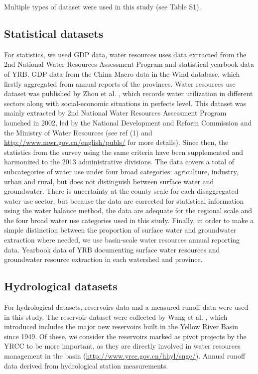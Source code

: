 \documentclass[9pt,twoside,lineno]{pnas-new}
\begin{document}
Multiple types of dataset were used in this study (see Table S1). 
\subsection*{Statistical datasets}
For statistics, we used GDP data, water resources uses data extracted from the 2nd National Water Resources Assessment Program \cite{zhouDecelerationChinaHuman2020} and statistical yearbook data of YRB. GDP data from the China Macro data in the Wind database, which firstly aggregated from annual reports of the provinces. Water resources use dataset was published by Zhou et al. \cite{zhouDecelerationChinaHuman2020}, which records water utilization in different sectors along with social-economic situations in perfects level. This dataset was mainly extracted by 2nd National Water Resources Assessment Program launched in 2002, led by the National Development and Reform Commission and the Ministry of Water Resources (see ref (1) and \url{http://www.mwr.gov.cn/english/publs/} for more details). Since then, the statistics from the survey using the same criteria have been supplemented and harmonized to the 2013 administrative divisions. 
The data covers a total of subcategories of water use under four broad categories: agriculture, industry, urban and rural, but does not distinguish between surface water and groundwater. There is uncertainty at the county scale for each disaggregated water use sector, but because the data are corrected for statistical information using the water balance method, the data are adequate for the regional scale and the four broad water use categories used in this study.
Finally, in order to make a simple distinction between the proportion of surface water and groundwater extraction where needed, we use basin-scale water resources annual reporting data. Yearbook data of YRB documenting surface water resources and groundwater resource extraction in each watershed and province. 


\subsection*{Hydrological datasets}
For hydrological datasets, reservoirs data and a measured runoff data were used in this study.
The reservoir dataset were collected by Wang et al. \cite{wangYellowRiverWater2019}, which introduced includes the major new reservoirs built in the Yellow River Basin since 1949. Of these, we consider the reservoirs marked as pivot projects by the YRCC to be more important, as they are directly involved in water resources management in the basin (\url{http://www.yrcc.gov.cn/hhyl/sngc/}). Annual runoff data derived from hydrological station measurements.
\end{document}
